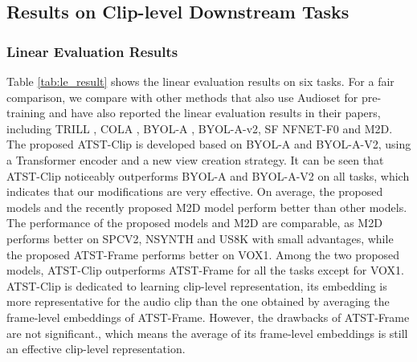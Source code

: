 \subsection{Results on Clip-level Downstream Tasks}

\subsubsection{Linear Evaluation Results}

Table \ref{tab:le_result} shows the linear evaluation results on six tasks.
For a fair comparison, we compare with other methods that also use Audioset for pre-training and have also reported the linear evaluation results in their papers, including TRILL \cite{shor2020towards}, COLA \cite{saeed_contrastive_2020}, BYOL-A \cite{niizumi_byol_2021}, BYOL-A-v2\cite{niizumi_byol_2023}, SF NFNET-F0\cite{wang_towards_2022} and M2D\cite{niizumi_masked_2023}. 
The proposed ATST-Clip is developed based on BYOL-A and BYOL-A-V2, using a Transformer encoder and a new view creation strategy. It can be seen that ATST-Clip noticeably outperforms BYOL-A and BYOL-A-V2 on all tasks, which indicates that our modifications are very effective. On average, the proposed models and the recently proposed M2D model perform better than other models. The performance of the proposed models and M2D are comparable, as M2D performs better on SPCV2, NSYNTH and US8K with small advantages, while the proposed ATST-Frame performs better on VOX1. Among the two proposed models, ATST-Clip outperforms ATST-Frame for all the tasks except for VOX1. ATST-Clip is dedicated to learning clip-level representation, its embedding is more representative for the audio clip than the one obtained by averaging the frame-level embeddings of ATST-Frame. However, the drawbacks of ATST-Frame are not significant., which means the average of its frame-level embeddings is still an effective clip-level representation. 






